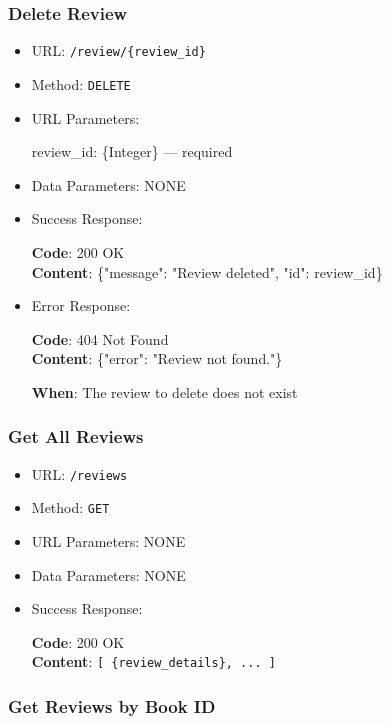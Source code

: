 \subsubsection*{Delete Review}

\begin{itemize}
    \item URL: \texttt{/review/\{review\_id\}}
    \item Method: \texttt{DELETE}
    \item URL Parameters:

    review\_id: \{Integer\} — required

    \item Data Parameters: NONE

    \item Success Response: \newline

    \textbf{Code}: 200 OK \\
    \textbf{Content}: \{"message": "Review deleted", "id": review\_id\}

    \item Error Response: \newline

    \textbf{Code}: 404 Not Found \\
    \textbf{Content}: \{"error": "Review not found."\}

    \textbf{When}: The review to delete does not exist
\end{itemize}

\subsubsection*{Get All Reviews}

\begin{itemize}
    \item URL: \texttt{/reviews}
    \item Method: \texttt{GET}
    \item URL Parameters: NONE
    \item Data Parameters: NONE

    \item Success Response: \newline

    \textbf{Code}: 200 OK \\
    \textbf{Content}: \texttt{[ \{review\_details\}, ... ]}
\end{itemize}

\subsubsection*{Get Reviews by Book ID}

